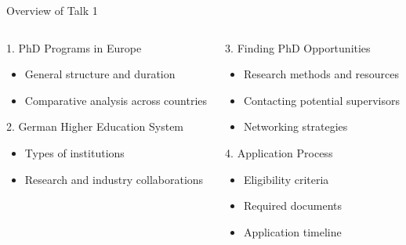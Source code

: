 \documentclass[10pt]{beamer}
\begin{document}
\begin{frame}[fragile]{Overview of Talk 1}
\begin{columns}[T]
    \begin{column}{0.5\textwidth}
        \alert{1. PhD Programs in Europe}
        \begin{itemize}
            \item General structure and duration
            \item Comparative analysis across countries
        \end{itemize}
        \alert{2. German Higher Education System}
        \begin{itemize}
            \item Types of institutions
            \item Research and industry collaborations
        \end{itemize}
    \end{column}
    \begin{column}{0.5\textwidth}
        \alert{3. Finding PhD Opportunities}
        \begin{itemize}
            \item Research methods and resources
            \item Contacting potential supervisors
            \item Networking strategies
        \end{itemize}
        \alert{4. Application Process}
        \begin{itemize}
            \item Eligibility criteria
            \item Required documents
            \item Application timeline
        \end{itemize}
    \end{column}
\end{columns}
\end{frame}
\end{document}
